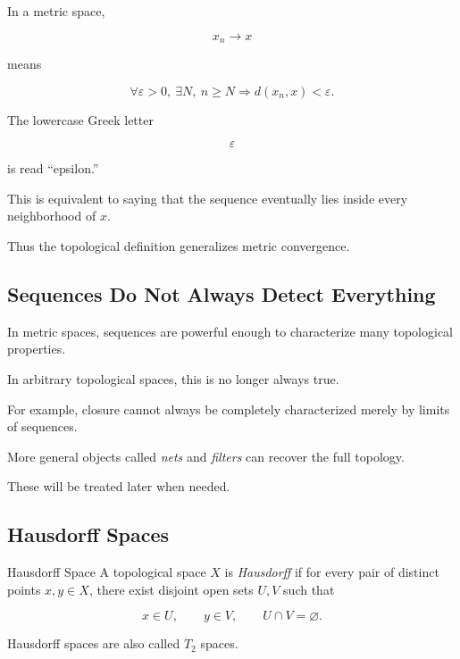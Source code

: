 In a metric space,

\[
x_n\to x
\]

means

\[
\boxed{
\forall\varepsilon>0,\
\exists N,\
n\geq N
\Longrightarrow
d(x_n,x)<\varepsilon.
}
\]

The lowercase Greek letter

\[
\varepsilon
\]

is read ``epsilon.''

This is equivalent to saying that the sequence eventually lies inside every
neighborhood of \(x\).

Thus the topological definition generalizes metric convergence.

\subsection{Sequences Do Not Always Detect Everything}
\label{subsec:sequences-not-enough}

In metric spaces, sequences are powerful enough to characterize many
topological properties.

In arbitrary topological spaces, this is no longer always true.

For example, closure cannot always be completely characterized merely by
limits of sequences.

More general objects called \emph{nets} and \emph{filters} can recover the
full topology.

These will be treated later when needed.

\subsection{Hausdorff Spaces}
\label{subsec:hausdorff-spaces}

\begin{definitionbox}{Hausdorff Space}
A topological space \(X\) is \emph{Hausdorff} if for every pair of distinct
points \(x,y\in X\), there exist disjoint open sets \(U,V\) such that

\[
\boxed{
x\in U,
\qquad
y\in V,
\qquad
U\cap V=\varnothing.
}
\]
\end{definitionbox}

Hausdorff spaces are also called \(T_2\) spaces.

